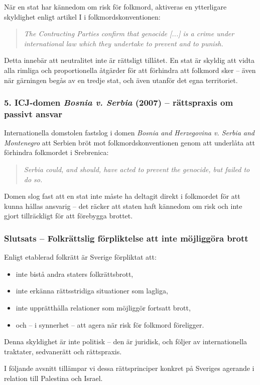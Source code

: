 När en stat har kännedom om risk för folkmord, aktiveras en ytterligare skyldighet enligt 
artikel I i folkmordskonventionen:

\begin{quote}
\textit{The Contracting Parties confirm that genocide [...] is a crime under international law which they undertake to prevent and to punish.}
\end{quote}

Detta innebär att neutralitet inte är rättsligt tillåtet. En stat är skyldig att 
vidta alla rimliga och proportionella åtgärder för att förhindra att folkmord sker – även 
när gärningen begås av en tredje stat, och även utanför det egna territoriet.

\subsubsection*{ 5. ICJ-domen \textit{Bosnia v. Serbia} (2007) – rättspraxis om passivt ansvar}

Internationella domstolen fastslog i domen \textit{Bosnia and Herzegovina v. Serbia and Montenegro} att 
Serbien bröt mot folkmordskonventionen genom att underlåta att förhindra folkmordet i Srebrenica:

\begin{quote}
\textit{Serbia could, and should, have acted to prevent the genocide, but failed to do so.}
\end{quote}

Domen slog fast att en stat inte måste ha deltagit direkt i folkmordet för att kunna hållas 
ansvarig – det räcker att staten haft kännedom om risk och inte gjort tillräckligt för att förebygga brottet.

\subsubsection*{ Slutsats – Folkrättslig förpliktelse att inte möjliggöra brott}

Enligt etablerad folkrätt är Sverige förpliktat att:
\begin{itemize}
  \item inte bistå andra staters folkrättsbrott,
  \item inte erkänna rättsstridiga situationer som lagliga,
  \item inte upprätthålla relationer som möjliggör fortsatt brott,
  \item och – i synnerhet – att agera när risk för folkmord föreligger.
\end{itemize}

Denna skyldighet är inte politisk – den är juridisk, och följer av internationella traktater, sedvanerätt och rättspraxis.

I följande avsnitt tillämpar vi dessa rättsprinciper konkret på Sveriges agerande i relation till Palestina och Israel.

